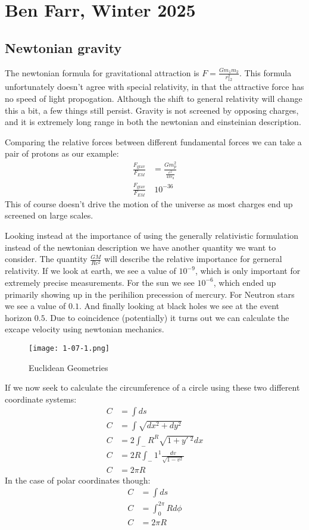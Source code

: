 \chapter{Ben Farr, Winter 2025}
\section{Newtonian gravity}
The newtonian formula for gravitational attraction is $F = \frac{Gm_1 m_2}{r_{12}^2}$. This formula unfortunately doesn't agree with special relativity, in that the attractive force has no speed of light propogation.
Although the shift to general relativity will change this a bit, a few things still persist. Gravity is not screened by opposing charges, and it is extremely long range in both the newtonian and einsteinian description.

Comparing the relative forces between different fundamental forces we can take a pair of protons as our example:
\begin{align*}
	\frac{F_\text{grav}}{F_{EM}} &= \frac{Gm_p^2}{\frac{e^2}{4\pi\epsilon_0}} \\
	\frac{F_\text{grav}}{F_{EM}} &~ 10^{-36}
\end{align*}
This of course doesn't drive the motion of the universe as most charges end up screened on large scales.

Looking instead at the importance of using the generally relativistic formulation instead of the newtonian description we have another quantity we want to consider. The quantity $\frac{GM}{Rc^2}$ will describe the relative importance for gerneral relativity.
If we look at earth, we see a value of $10^{-9}$, which is only important for extremely precise measurements. For the sun we see $10^{-6}$, which ended up primarily showing up in the perihilion precession of mercury.
For Neutron stars we see a value of $0.1$. And finally looking at black holes we see at the event horizon $0.5$. Due to coincidence (potentially) it turns out we can calculate the excape velocity using newtonian mechanics.

\begin{figure*}[h]
	\centering
	\texttt{[image: 1-07-1.png]}
	\caption*{Euclidean Geometries}
\end{figure*}
If we now seek to calculate the circumference of a circle using these two different coordinate systems:
\begin{align*}
	C &= \int ds \\
	C &= \int \sqrt{dx^2 + dy^2} \\
	C &= 2\int_-R^R \sqrt{1 + y'\ ^2}dx \\
	C &= 2R\int_-1^1 \frac{dv}{\sqrt{1-v^2}} \\
	C &= 2\pi R
\end{align*}
In the case of polar coordinates though:
\begin{align*}
	C &= \int ds \\
	C &= \int_0^{2\pi} R d\phi \\
	C &= 2\pi R
\end{align*}

